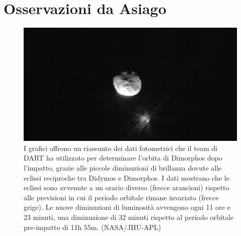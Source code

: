 \documentclass[a4paper,11pt,openright]{book}
\begin{document}
\section{Osservazioni da Asiago}


\begin{figure}
    \centering
    \includegraphics[width=\textwidth]{figure/liciacube_impact_1.png}
    \caption[Riassunto dei dati fotometrici utilizzati per determinare l'orbita post-impatto.]{I grafici offrono un riassunto dei dati fotometrici che il team di DART ha utilizzato per determinare l'orbita di Dimorphos dopo l'impatto, grazie alle piccole diminuzioni di brillanza dovute alle eclissi reciproche tra Didymos e Dimorphos. I dati mostrano che le eclissi sono avvenute a un orario diverso (frecce arancioni) rispetto alle previsioni in cui il periodo orbitale rimane invariato (frecce grige). Le nuove diminuzioni di luminosità avvengono ogni 11 ore e 23 minuti, una diminuzione di 32 minuti rispetto al periodo orbitale pre-impatto di 11h 55m. (NASA/JHU-APL)}
    \label{fig:liciacube_impact_1}
\end{figure}
\end{document}
